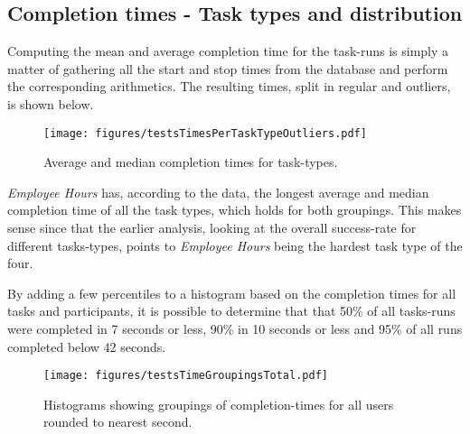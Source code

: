 
%
  \subsection{Completion times - Task types and distribution}

    Computing the mean and average completion time for the task-runs is
    simply a matter of gathering all the start and stop times from the
    database and perform the corresponding arithmetics. The resulting times,
    split in regular and outliers, is shown below.

    \begin{figure}[h!]
      \centering
      \texttt{[image: figures/testsTimesPerTaskTypeOutliers.pdf]}
      \vspace{-0.3cm}
      \caption{Average and median completion times for task-types. }
      \label{label_testsTimesPerTaskTypeOutliers}
    \end{figure}


    \textit{Employee Hours} has, according to the data, the longest average
    and median completion time of all the task types, which holds for both
    groupings. This makes sense since that the earlier analysis, looking at
    the overall success-rate for different tasks-types, points to
    \textit{Employee Hours} being the hardest task type of the four.

    By adding a few percentiles to a histogram based on the completion times for all
    tasks and participants, it is possible to determine that that 50\% of
    all tasks-runs were completed in 7 seconds or less, 90\% in 10 seconds
    or less and 95\% of all runs completed below 42 seconds.

    \begin{figure}[h!]
      \centering
      \texttt{[image: figures/testsTimeGroupingsTotal.pdf]}
      \caption{
        Histograms showing groupings of completion-times for all users
        rounded to nearest second.
      }
    \end{figure}

